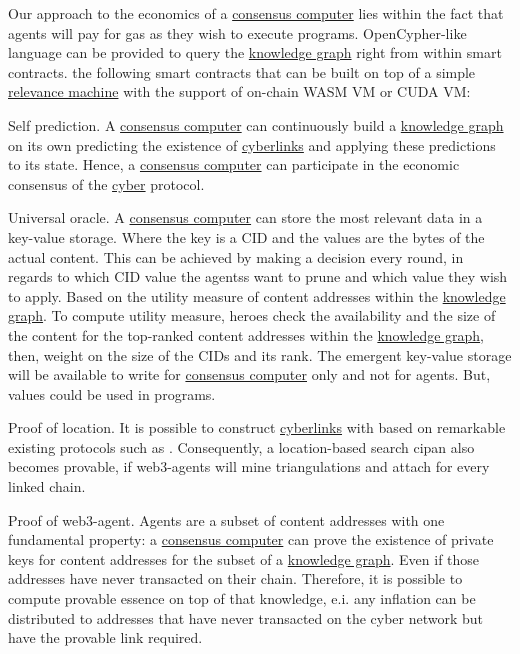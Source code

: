 \documentclass[8pt,oneside]{amsart}
\newcommand{\linkgreen}[2]{\href{#1}{\color{green}{#2}}}
\begin{document}
Our approach to the economics of a {\hyperref[consensus-computer]{consensus computer}} lies within the fact that agents will pay for gas as they wish to execute programs. OpenCypher-like language can be provided to query the {\hyperref[knowledge-graph]{knowledge graph}} right from within smart contracts. \linkgreen{https://medium.com/@karpathy/software-2-0-a64152b37c35}{We can envision} the following smart contracts that can be built on top of a simple {\hyperref[relevance-machine]{relevance machine}} with the support of on-chain WASM VM or CUDA VM:

Self prediction. A {\hyperref[consensus-computer]{consensus computer}} can continuously build a {\hyperref[knowledge-graph]{knowledge graph}} on its own predicting the existence of {\hyperref[cyberlinks]{cyberlinks}} and applying these predictions to its state. Hence, a {\hyperref[consensus-computer]{consensus computer}} can participate in the economic consensus of the {\hyperref[cyber]{cyber}} protocol.

Universal oracle. A {\hyperref[consensus-computer]{consensus computer}} can store the most relevant data in a key-value storage. Where the key is a CID and the values are the bytes of the actual content. This can be achieved by making a decision every round, in regards to which CID value the agentss want to prune and which value they wish to apply. Based on the utility measure of content addresses within the {\hyperref[knowledge-graph]{knowledge graph}}. To compute utility measure, heroes check the availability and the size of the content for the top-ranked content addresses within the {\hyperref[knowledge-graph]{knowledge graph}}, then, weight on the size of the CIDs and its rank. The emergent key-value storage will be available to write for {\hyperref[consensus-computer]{consensus computer}} only and not for agents. But, values could be used in programs.

Proof of location. It is possible to construct {\hyperref[cyberlinks]{cyberlinks}} with \linkgreen{https://ipfs.io/ipfs/QmZYKGuLHf2h1mZrhiP2FzYsjj3tWt2LYduMCRbpgi5pKG}{Proof-of-Location} based on remarkable existing protocols such as \linkgreen{https://ipfs.io/ipfs/QmZYKGuLHf2h1mZrhiP2FzYsjj3tWt2LYduMCRbpgi5pKG}{FOAM}. Consequently, a location-based search cipan also becomes provable, if web3-agents will mine triangulations and attach \linkgreen{https://ipfs.io/ipfs/QmZYKGuLHf2h1mZrhiP2FzYsjj3tWt2LYduMCRbpgi5pKG}{proof-of-location} for every linked chain.

Proof of web3-agent. Agents are a subset of content addresses with one fundamental property: a {\hyperref[consensus-computer]{consensus computer}} can prove the existence of private keys for content addresses for the subset of a {\hyperref[knowledge-graph]{knowledge graph}}. Even if those addresses have never transacted on their chain. Therefore, it is possible to compute provable essence on top of that knowledge, e.i. any inflation can be distributed to addresses that have never transacted on the cyber network but have the provable link required.
\end{document}
